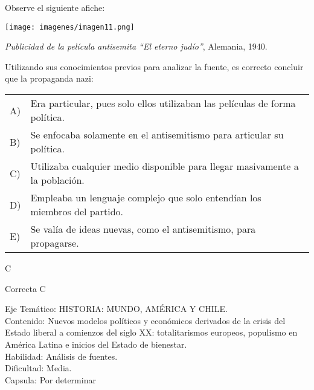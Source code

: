 \documentclass[letterpaper,11pt]{article}
\newcommand{\anchopregunta}{0.9\textwidth}
\begin{document}
\begin{enumerate}
\begin{minipage}{\anchopregunta}
\item Observe el siguiente afiche:\\
\begin{center}
    \texttt{[image: imagenes/imagen11.png]}
\end{center}
\begin{flushright}
\textit{Publicidad de la película antisemita ``El eterno judío''}, Alemania, 1940.
\end{flushright}
Utilizando sus conocimientos previos para analizar la fuente, es correcto concluir que la propaganda nazi:
\begin{flushleft}\begin{tabular}{@{\hspace{-.001\textwidth}}l@{\hspace{2pt}}p{}}
A)& Era particular, pues solo ellos utilizaban las películas de forma política.\\
B)& Se enfocaba solamente en el antisemitismo para articular su política.\\
C)& Utilizaba cualquier medio disponible para llegar masivamente a la población.\\
D)& Empleaba un lenguaje complejo que solo entendían los miembros del partido.\\
E)& Se valía de ideas nuevas, como el antisemitismo, para propagarse.\\ 
\end{tabular}\end{flushleft}%
\begin{key} C
\end{key} 
\begin{hint}
\end{hint}
\begin{answer} Correcta C\\
\end{answer}
\begin{info} %
\begin{flushleft}
Eje Temático: HISTORIA: MUNDO, AMÉRICA Y CHILE.\\
Contenido: Nuevos modelos políticos y económicos derivados de la crisis del Estado liberal a comienzos del siglo XX: totalitarismos europeos, populismo en América Latina e inicios del Estado de bienestar.\\
Habilidad: Análisis de fuentes.\\
Dificultad: Media.\\
Capsula: Por determinar \\
\end{flushleft} 
\end{info}
\end{minipage}\vfill$\;$ %


\end{enumerate}
\end{document}
